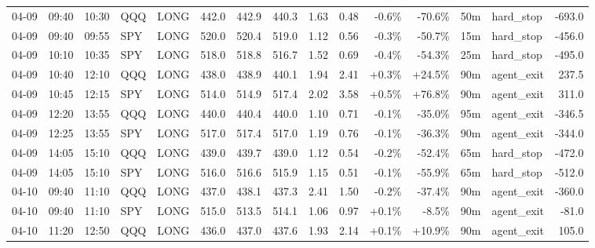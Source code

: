 \documentclass[11pt,a4paper,twoside]{article}
\begin{document}
\begin{landscape}
\begin{center}
\begin{longtable}{>{\color{txtmain}}l l l l l r r r r r r r r >{\color{txtmain}}l r}
04-09 & 09:40 & 10:30 & QQQ & LONG & 442.0 & 442.9 & 440.3 & 1.63 & 0.48 & \textcolor{lossred}{-0.6\%} & \textcolor{lossred}{-70.6\%} & 50m & hard\_stop & \textcolor{lossred}{-693.0} \\
04-09 & 09:40 & 09:55 & SPY & LONG & 520.0 & 520.4 & 519.0 & 1.12 & 0.56 & \textcolor{lossred}{-0.3\%} & \textcolor{lossred}{-50.7\%} & 15m & hard\_stop & \textcolor{lossred}{-456.0} \\
04-09 & 10:10 & 10:35 & SPY & LONG & 518.0 & 518.8 & 516.7 & 1.52 & 0.69 & \textcolor{lossred}{-0.4\%} & \textcolor{lossred}{-54.3\%} & 25m & hard\_stop & \textcolor{lossred}{-495.0} \\
04-09 & 10:40 & 12:10 & QQQ & LONG & 438.0 & 438.9 & 440.1 & 1.94 & 2.41 & \textcolor{wingreen}{+0.3\%} & \textcolor{wingreen}{+24.5\%} & 90m & agent\_exit & \textcolor{wingreen}{237.5} \\
04-09 & 10:45 & 12:15 & SPY & LONG & 514.0 & 514.9 & 517.4 & 2.02 & 3.58 & \textcolor{wingreen}{+0.5\%} & \textcolor{wingreen}{+76.8\%} & 90m & agent\_exit & \textcolor{wingreen}{311.0} \\
04-09 & 12:20 & 13:55 & QQQ & LONG & 440.0 & 440.4 & 440.0 & 1.10 & 0.71 & \textcolor{lossred}{-0.1\%} & \textcolor{lossred}{-35.0\%} & 95m & agent\_exit & \textcolor{lossred}{-346.5} \\
04-09 & 12:25 & 13:55 & SPY & LONG & 517.0 & 517.4 & 517.0 & 1.19 & 0.76 & \textcolor{lossred}{-0.1\%} & \textcolor{lossred}{-36.3\%} & 90m & agent\_exit & \textcolor{lossred}{-344.0} \\
04-09 & 14:05 & 15:10 & QQQ & LONG & 439.0 & 439.7 & 439.0 & 1.12 & 0.54 & \textcolor{lossred}{-0.2\%} & \textcolor{lossred}{-52.4\%} & 65m & hard\_stop & \textcolor{lossred}{-472.0} \\
04-09 & 14:05 & 15:10 & SPY & LONG & 516.0 & 516.6 & 515.9 & 1.15 & 0.51 & \textcolor{lossred}{-0.1\%} & \textcolor{lossred}{-55.9\%} & 65m & hard\_stop & \textcolor{lossred}{-512.0} \\
04-10 & 09:40 & 11:10 & QQQ & LONG & 437.0 & 438.1 & 437.3 & 2.41 & 1.50 & \textcolor{lossred}{-0.2\%} & \textcolor{lossred}{-37.4\%} & 90m & agent\_exit & \textcolor{lossred}{-360.0} \\
04-10 & 09:40 & 11:10 & SPY & LONG & 515.0 & 513.5 & 514.1 & 1.06 & 0.97 & \textcolor{wingreen}{+0.1\%} & \textcolor{lossred}{-8.5\%} & 90m & agent\_exit & \textcolor{lossred}{-81.0} \\
04-10 & 11:20 & 12:50 & QQQ & LONG & 436.0 & 437.0 & 437.6 & 1.93 & 2.14 & \textcolor{wingreen}{+0.1\%} & \textcolor{wingreen}{+10.9\%} & 90m & agent\_exit & \textcolor{wingreen}{105.0} \\

\end{longtable}
\end{center}
\end{landscape}
\end{document}
